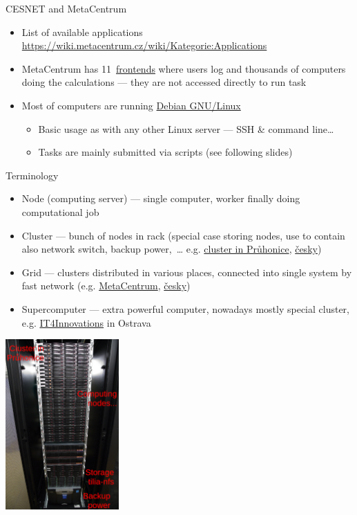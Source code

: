 \documentclass[compress, ucs, xelatex, 11pt, xcolor=svgnames, aspectratio=169,
	hyperref={
		bookmarks=true,
		unicode=true,
		colorlinks=true,
		pdftitle={Linux, command line and MetaCentrum},
		plainpages=false,
		pdfauthor={Vojtech Zeisek},
		pdfsubject={Course about use of Linux command line, writing shell scripts and using MetaCentrum of CESNET},
		pdfcreator={XeLaTeX},
		pdfkeywords={Linux, GNU, BASH, shell, command line, MetaCentrum},
		linkcolor=DarkRed, %
		anchorcolor=DarkBlue, %
		citecolor=Indigo, %
		filecolor=NavyBlue, %
		menucolor=DarkMagenta, %
		urlcolor=DarkBlue, %
		pdftex},
	url={hyphens, lowtilde} %
	]{beamer}
\begin{document}
\begin{frame}[allowframebreaks]{CESNET and MetaCentrum}
\begin{itemize}
		\item List of available applications \url{https://wiki.metacentrum.cz/wiki/Kategorie:Applications}
		\item MetaCentrum has 11~\href{https://wiki.metacentrum.cz/wiki/Frontend}{frontends} where users log and thousands of computers doing the calculations --- they are not accessed directly to run task
		\item Most of computers are running \href{https://www.debian.org/}{Debian GNU/Linux}
		\begin{itemize}
			\item Basic usage as with any other Linux server --- SSH \& command line\ldots
			\item Tasks are mainly submitted via scripts (see following slides)
		\end{itemize}
	\end{itemize}
\end{frame}

\begin{frame}{Terminology}
	\begin{multicols}{2}
		\begin{itemize}
			\item Node (computing server) --- single computer, worker finally doing computational job
			\item Cluster --- bunch of nodes in rack (special case storing nodes, use to contain also network switch, backup power,~\ldots{ } e.g. \href{https://sorbus.ibot.cas.cz/en/hw}{cluster in Průhonice}, \href{https://sorbus.ibot.cas.cz/cs/hw}{česky})
			\item Grid --- clusters distributed in various places, connected into single system by fast network (e.g. \href{https://www.metacentrum.cz/en/Sluzby/Grid/}{MetaCentrum}, \href{https://www.metacentrum.cz/cs/Sluzby/Grid/}{česky})
			\item Supercomputer --- extra powerful computer, nowadays mostly special cluster, e.g. \href{https://www.it4i.cz/}{IT4Innovations} in Ostrava
		\end{itemize}
		\begin{center}
			\includegraphics[height=6.5cm]{cluster_rack.jpg}
		\end{center}
	\end{multicols}
\end{frame}
\end{document}
